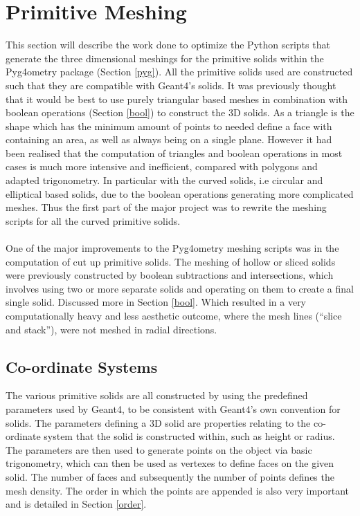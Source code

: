 \documentclass[12pt,a4paper]{article}
\begin{document}
\section{Primitive Meshing}
\label{prim}
This section will describe the work done to optimize the Python scripts that generate the three dimensional meshings for the primitive solids within the Pyg4ometry package (Section \ref{pyg}). All the primitive solids used are constructed such that they are compatible with Geant4's solids. It was previously thought that it would be best to use purely triangular based meshes in combination with boolean operations (Section \ref{bool}) to construct the 3D solids. As a triangle is the shape which has the minimum amount of points to needed define a face with containing an area, as well as always being on a single plane. However it had been realised that the computation of triangles and boolean operations in most cases is much more intensive and inefficient, compared with polygons and adapted trigonometry. In particular with the curved solids, i.e circular and elliptical based solids, due to the boolean operations generating more complicated meshes. Thus the first part of the major project was to rewrite the meshing scripts for all the curved primitive solids.
\\\\
One of the major improvements to the Pyg4ometry meshing scripts was in the computation of cut up primitive solids. The meshing of hollow or sliced solids were previously constructed by boolean subtractions and intersections, which involves using two or more separate solids and operating on them to create a final single solid. Discussed more in Section \ref{bool}. Which resulted in a very computationally heavy and less aesthetic outcome, where the mesh lines (``slice and stack''), were not meshed in radial directions.

\subsection{Co-ordinate Systems}
\label{cosy}
The various primitive solids are all constructed by using the predefined parameters used by Geant4, to be consistent with Geant4's own convention for solids. The parameters defining a 3D solid are properties relating to the co-ordinate system that the solid is constructed within, such as height or radius. The parameters are then used to generate points on the object via basic trigonometry, which can then be used as vertexes to define faces on the given solid. The number of faces and subsequently the number of points defines the mesh density. The order in which the points are appended is also very important and is detailed in Section \ref{order}.
\\\\
\end{document}
